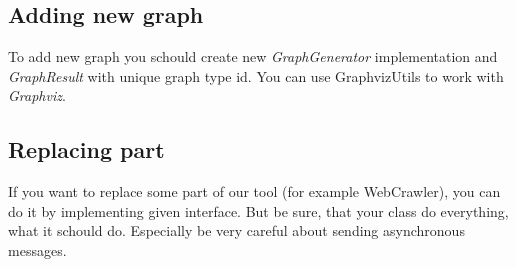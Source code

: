 \documentclass[12pt,a4paper]{article}
\begin{document}
\subsection{Adding new graph}
To add new graph you schould create new \textit{GraphGenerator} implementation and \textit{GraphResult} with unique graph type id. You can use GraphvizUtils to work with \textit{Graphviz}.

\subsection{Replacing part} \label{replacing part}
If you want to replace some part of our tool (for example WebCrawler), you can do it by implementing given interface. But be sure, that your class do everything, what it schould do. Especially be very careful about sending asynchronous messages.
\end{document}
